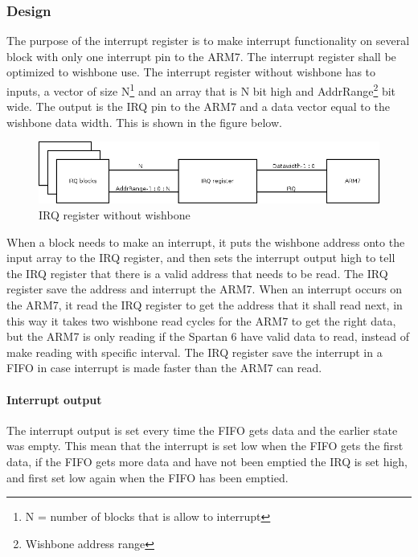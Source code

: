 \subsubsection{Design}
The purpose of the interrupt register is to make interrupt functionality on several block with only one interrupt pin to the ARM7. The interrupt register shall be optimized to wishbone use. The interrupt register without wishbone has to inputs, a vector of size N\footnote{N = number of blocks that is allow to interrupt} and an array that is N bit high and AddrRange\footnote{Wishbone address range} bit wide. The output is the IRQ pin to the ARM7 and a data vector equal to the wishbone data width. This is shown in the figure below.
\begin{figure}[H]
	\begin{centering}
		\includegraphics[width=1.0\textwidth]{images/tb5_irq_reg_nowb.png}
		\caption{IRQ register without wishbone}
	\end{centering}
\end{figure}
When a block needs to make an interrupt, it puts the wishbone address onto the input array to the IRQ register, and then sets the interrupt output high to tell the IRQ register that there is a valid address that needs to be read. The IRQ register save the address and interrupt the ARM7. When an interrupt occurs on the ARM7, it read the IRQ register to get the address that it shall read next, in this way it takes two wishbone read cycles for the ARM7 to get the right data, but the ARM7 is only reading if the Spartan 6 have valid data to read, instead of make reading with specific interval. The IRQ register save the interrupt in a FIFO in case interrupt is made faster than the ARM7 can read.\\
\paragraph{Interrupt output}
The interrupt output is set every time the FIFO gets data and the earlier state was empty. This mean that the interrupt is set low when the FIFO gets the first data, if the FIFO gets more data and have not been emptied the IRQ is set high, and first set low again when the FIFO has been emptied.
